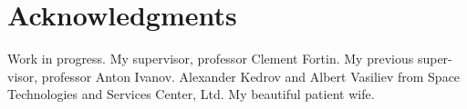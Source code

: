 \section*{Acknowledgments}

Work in progress. My supervisor, professor Clement Fortin. My previous super- visor, professor Anton Ivanov. Alexander Kedrov and Albert Vasiliev from Space Technologies and Services Center, Ltd. My beautiful patient wife.